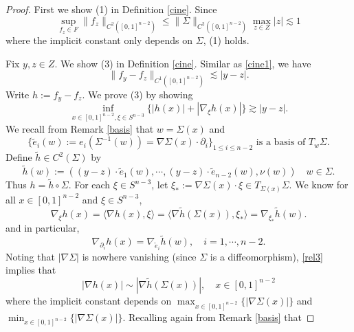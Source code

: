 \documentclass[10pt,a4paper]{amsart}
\begin{document}
\begin{proof}
First we show (1) in Definition \ref{cine}.
Since
\begin{equation}\label{cine1}
  \sup_{f_{z} \in F }\|f_{z}\|_{C^2([0,1]^{n-2})} \le \|\Sigma\|_{C^2([0,1]^{n-2})} \max_{z \in Z}|z| \lesssim 1
\end{equation}
 where the implicit constant only depends on $\Sigma$, (1) holds.

Fix $y,z \in Z$. We show (3) in Definition \ref{cine}. Similar as \eqref{cine1}, we have
\begin{equation}\label{dou1}
  \|f_y-f_{z}\|_{C^1([0,1]^{n-2})} \lesssim |y-z|.
\end{equation}
Write
$h:= f_y-f_{z}$. We prove (3) by showing
\begin{equation}\label{cine2}
  \inf_{x \in [0,1]^{n-2}, \xi \in S^{n-3}} \{ |h(x)| + |\nabla_\xi h(x)|  \} \gtrsim  |y-z|.
\end{equation}
We recall from Remark \ref{basis} that $w=\Sigma(x)$ and
$$  \{\tilde e_i(w):= e_i(\Sigma^{-1}(w))= \nabla \Sigma(x) \cdot \partial_i\}_{1\le i \le n-2} \mbox{ is a basis of $T_{w}\Sigma$}. $$
Define
$\tilde h  \in C^2(\Sigma)$ by
\begin{equation}\label{th}
  \tilde h(w):= ((y-z) \cdot \tilde e_1(w), \cdots,(y-z) \cdot \tilde e_{n-2}(w), \nu(w))  \quad w \in \Sigma.
\end{equation}
Thus $h=\tilde h \circ \Sigma$. For each $\xi \in S^{n-3}$, let $\xi_\ast:= \nabla \Sigma(x) \cdot \xi \in T_{\Sigma(x)} \Sigma$. We know for all $x \in [0,1]^{n-2}$ and $\xi \in S^{n-3}$,
\begin{equation}\label{rel3}
 \nabla_\xi h (x)= \langle\nabla h (x), \xi \rangle = \langle\nabla \tilde h (\Sigma(x)), \xi_\ast \rangle = \nabla_{\xi_\ast} \tilde h (w).
\end{equation}
and in particular,
\begin{equation} \label{chain}
  \nabla_{\partial_i} h (x) = \nabla_{\tilde e_i} \tilde h (w), \quad i =1, \cdots, n-2.
\end{equation}
Noting that $|\nabla \Sigma|$ is nowhere vanishing (since $\Sigma$ is a diffeomorphism), \eqref{rel3} implies that
\begin{equation}\label{rel4}
  |\nabla h (x)| \sim  |\nabla \tilde h (\Sigma(x))|, \quad x \in [0,1]^{n-2}
\end{equation}
where the implicit constant depends on $\max_{x \in [0,1]^{n-2}}\{|\nabla \Sigma(x)|\}$ and $\min_{x \in [0,1]^{n-2}}\{|\nabla \Sigma(x)|\}$.
Recalling again from Remark  \ref{basis} that

\end{proof}
\end{document}
